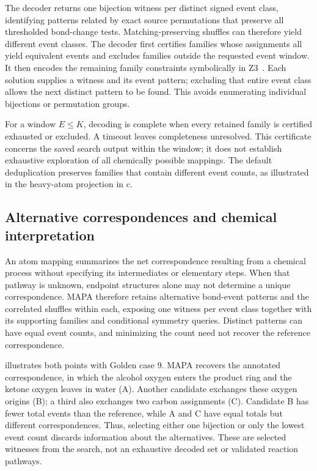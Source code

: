 The decoder returns one bijection witness per distinct signed event class, identifying patterns related by exact source permutations that preserve all thresholded bond-change tests. Matching-preserving shuffles can therefore yield different event classes. The decoder first certifies families whose assignments all yield equivalent events and excludes families outside the requested event window. It then encodes the remaining family constraints symbolically in Z3~\citep{demoura2008}. Each solution supplies a witness and its event pattern; excluding that entire event class allows the next distinct pattern to be found. This avoids enumerating individual bijections or permutation groups.

For a window $E\leq K$, decoding is complete when every retained family is certified exhausted or excluded. A timeout leaves completeness unresolved. This certificate concerns the saved search output within the window; it does not establish exhaustive exploration of all chemically possible mappings. The default deduplication preserves families that contain different event counts, as illustrated in the heavy-atom projection in c.

\FloatBarrier
\subsection{Alternative correspondences and chemical interpretation}

An atom mapping summarizes the net correspondence resulting from a chemical process without specifying its intermediates or elementary steps. When that pathway is unknown, endpoint structures alone may not determine a unique correspondence. MAPA therefore retains alternative bond-event patterns and the correlated shuffles within each, exposing one witness per event class together with its supporting families and conditional symmetry queries. Distinct patterns can have equal event counts, and minimizing the count need not recover the reference correspondence.

 illustrates both points with Golden case 9. MAPA recovers the annotated correspondence, in which the alcohol oxygen enters the product ring and the ketone oxygen leaves in water (A). Another candidate exchanges these oxygen origins (B); a third also exchanges two carbon assignments (C). Candidate B has fewer total events than the reference, while A and C have equal totals but different correspondences. Thus, selecting either one bijection or only the lowest event count discards information about the alternatives. These are selected witnesses from the search, not an exhaustive decoded set or validated reaction pathways.

